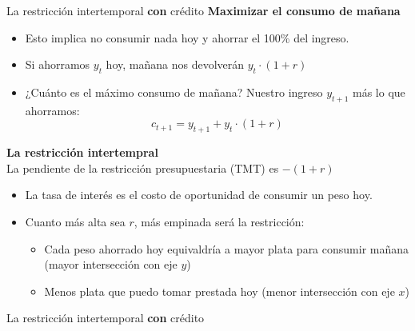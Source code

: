 \documentclass{beamer}
\begin{document}
\begin{frame}{La restricción intertemporal \textbf{con} crédito}
   \textcolor{blue!70!black}{\textbf{Maximizar el consumo de mañana}} 
    \begin{itemize} \small
        \item Esto implica no consumir nada hoy y ahorrar el 100\% del ingreso.
        \item Si ahorramos $y_t$ hoy, mañana nos devolverán $y_t \cdot(1+r)$
        \item ¿Cuánto es el máximo consumo de mañana? Nuestro ingreso $y_{t+1}$ más lo que ahorramos:
            \[c_{t+1} = y_{t+1} +y_{t}\cdot(1+r)\]
    \end{itemize}
\vspace{2mm}
   \textcolor{blue!70!black}{\textbf{La restricción intertempral}} \\
    La pendiente de la restricción presupuestaria (TMT) es $-(1+r)$
    \begin{itemize} \small
        \item La tasa de interés es el costo de oportunidad de consumir un peso hoy.
        \item Cuanto más alta sea $r$, más empinada será la restricción: 
            \begin{itemize}  \footnotesize
            \item Cada peso ahorrado hoy equivaldría a mayor plata para consumir mañana (mayor intersección con eje $y$)
            \item Menos plata que puedo tomar prestada hoy (menor intersección con eje $x$)
            \end{itemize}
    \end{itemize}
\end{frame}


\begin{frame}{La restricción intertemporal \textbf{con} crédito}
\begin{center}
\begin{figure}[H]
\begin{center}
\end{center}
\end{figure}
\end{center} 
\end{frame}
\end{document}
